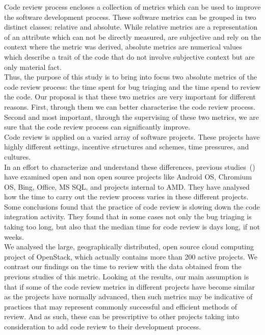 \documentclass[10pt, conference]{IEEEtran}
\begin{document}
Code review process encloses a collection of metrics 
which can be used to improve the software development process.
These software metrics can be grouped in two distinct classes: relative and absolute.
While relative metrics are a representation of an attribute which can not be directly 
measured, are subjective and rely on the context where the metric was derived, 
absolute metrics are numerical values which describe a trait of the code that do not 
involve subjective context but are only material fact.
\\
Thus, the purpose of this study is to bring into focus two absolute metrics of the code 
review process: the time spent for bug triaging and the time spend to
review the code. Our proposal 
is that these two metrics are very important for different reasons. 
First, through them we can better characterise the code review process. 
Second and most important, through the supervising of these two metrics, we are sure that 
the code review process can significantly improve.
\\
Code review is applied on a varied array of software projects. These projects have highly different 
settings, incentive structures and schemes, time pressures, and cultures.
\\
In an effort to characterize and understand these differences, previous studies~(\cite{bib13,bib14,bib18}) 
have examined open and non open source projects like Android OS, Chromium OS, Bing, Office, MS SQL, 
and projects internal to AMD. 
They have analysed how the time to carry out the review process varies in these different projects. 
Some conclusions found that the practice of code review is slowing down the code integration activity. 
They found that in some cases not only the bug triaging is taking too long, but also that the median time 
for code review is days long, if not weeks.
\\
We analysed the large, geographically distributed, open source cloud computing project of OpenStack, which actually contains more 
than 200 active projects.
We contrast our findings on the time to review with the data obtained from the previous studies of 
this metric.
Looking at the results, our main assumption is that if some of the code review metrics in different projects have become 
similar as the projects have normally advanced, then such metrics may be indicative of practices 
that may represent commonly successful and efficient methods of review.
And as such, these can be prescriptive to other projects taking into consideration to add code 
review to their development process.
%
%
\end{document}
